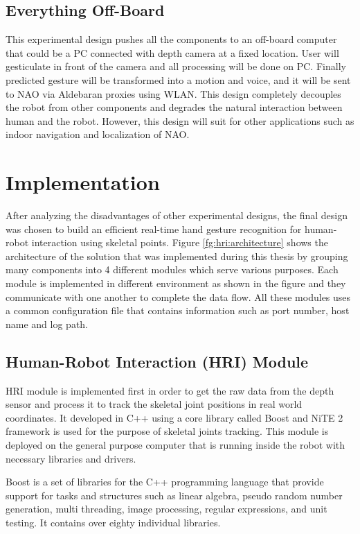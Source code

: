 

\subsection{Everything Off-Board} This experimental design pushes all the components to an off-board computer that could be a PC connected with depth camera at a fixed location. User will gesticulate in front of the camera and all processing will be done on PC. Finally predicted gesture will be transformed into a motion and voice, and it will be sent to NAO via Aldebaran proxies using WLAN. This design completely decouples the robot from other components and degrades the natural interaction between human and the robot. However, this design will suit for other applications such as indoor navigation and localization of NAO.

\section{Implementation } After analyzing the disadvantages of other experimental designs, the final design was chosen to build an efficient real-time hand gesture recognition for human-robot interaction using skeletal points. Figure \ref{fg:hri:architecture} shows the architecture of the solution that was implemented during this thesis by grouping many components into 4 different modules which serve various purposes. Each module is implemented in different environment as shown in the figure and they communicate with one another to complete the data flow. All these modules uses a common configuration file that contains information such as port number, host name and log path.



\subsection{Human-Robot Interaction (HRI) Module} HRI module is implemented first in order to get the raw data from the depth sensor and process it to track the skeletal joint positions in real world coordinates. It developed in C++ using a core library called Boost and NiTE 2 framework is used for the purpose of skeletal joints tracking. This module is deployed on the general purpose computer that is running inside the robot with necessary libraries and drivers.

Boost is a set of libraries for the C++ programming language that provide support for tasks and structures such as linear algebra, pseudo random number generation, multi threading, image processing, regular expressions, and unit testing. It contains over eighty individual libraries.

